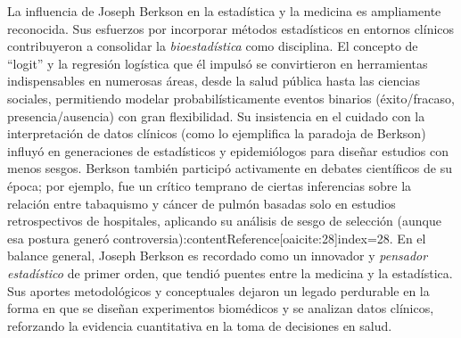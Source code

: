 \documentclass[12pt]{article}
\begin{document}
La influencia de Joseph Berkson en la estadística y la medicina es ampliamente reconocida. Sus esfuerzos por incorporar métodos estadísticos en entornos clínicos contribuyeron a consolidar la \emph{bioestadística} como disciplina. El concepto de “logit” y la regresión logística que él impulsó se convirtieron en herramientas indispensables en numerosas áreas, desde la salud pública hasta las ciencias sociales, permitiendo modelar probabilísticamente eventos binarios (éxito/fracaso, presencia/ausencia) con gran flexibilidad. Su insistencia en el cuidado con la interpretación de datos clínicos (como lo ejemplifica la paradoja de Berkson) influyó en generaciones de estadísticos y epidemiólogos para diseñar estudios con menos sesgos. Berkson también participó activamente en debates científicos de su época; por ejemplo, fue un crítico temprano de ciertas inferencias sobre la relación entre tabaquismo y cáncer de pulmón basadas solo en estudios retrospectivos de hospitales, aplicando su análisis de sesgo de selección (aunque esa postura generó controversia):contentReference[oaicite:28]{index=28}. En el balance general, Joseph Berkson es recordado como un innovador y \emph{pensador estadístico} de primer orden, que tendió puentes entre la medicina y la estadística. Sus aportes metodológicos y conceptuales dejaron un legado perdurable en la forma en que se diseñan experimentos biomédicos y se analizan datos clínicos, reforzando la evidencia cuantitativa en la toma de decisiones en salud.
\end{document}
